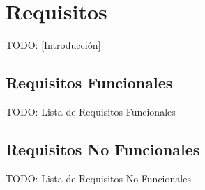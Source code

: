 \chapter{Requisitos\label{cap:requisitos}}

TODO: [Introducción]


\section{Requisitos Funcionales\label{sec:req:rf}}

TODO: Lista de Requisitos Funcionales


\section{Requisitos No Funcionales\label{sec:req:rnf}}

TODO: Lista de Requisitos No Funcionales
